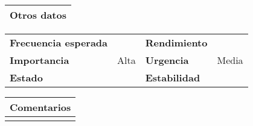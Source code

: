 \documentclass[11pt,a4paper]{article}
\begin{document}
\begin{table}[H]
	\begin{tabularx}{\textwidth}{X}
		\textbf{Otros datos}\\ \hline
	\end{tabularx}
	\begin{tabularx}{\textwidth}{lXlX}
		\textbf{Frecuencia esperada} &  & \textbf{Rendimiento} & \\
		\textbf{Importancia} & Alta & \textbf{Urgencia} & Media \\
		\textbf{Estado} &  & \textbf{Estabilidad} & \\
	\end{tabularx}
	
	\bigskip
	
	\begin{tabularx}{\textwidth}{X}
		\textbf{Comentarios}\\ \hline
		[...] \\
	\end{tabularx}
\end{table}

\newpage




\end{document}
